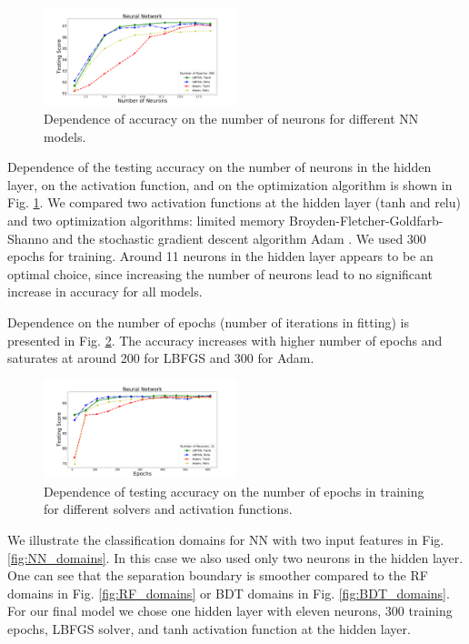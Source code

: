 \documentclass[referee]{aa} %
\begin{document}
\begin{figure}[h]
\centering
\includegraphics[width=0.5\textwidth]{plots/nn_train_neurons_assocnewfeat.pdf}
\caption{Dependence of accuracy on the number of neurons for different NN models.}
\label{fig:NN_neurons}
\end{figure}

Dependence of the testing accuracy on the number of neurons in the hidden layer, on the activation function, 
and on the optimization algorithm is shown in Fig. \ref{fig:NN_neurons}. 
We compared two activation functions at the hidden layer (tanh and relu) and two optimization algorithms: 
limited memory Broyden-Fletcher-Goldfarb-Shanno \citep[LBFGS;][]{lbfgs} 
and the stochastic gradient descent algorithm Adam \citep{2014arXiv1412.6980K}.
We used 300 epochs for training.
Around 11 neurons in the hidden layer appears to be an optimal choice, since increasing the number of neurons lead to no significant increase in accuracy for all models. 

Dependence on the number of epochs (number of iterations in fitting) is presented in Fig. \ref{fig:NN_epochs}. 
The accuracy increases with higher number of epochs and saturates at around 200 for LBFGS and 300 for Adam. 




\begin{figure}[h]
\centering
\includegraphics[width=0.5\textwidth]{plots/nn_train_epochs_assocnewfeat.pdf}
\caption{
Dependence of testing accuracy on the number of epochs in training for different solvers and activation functions.
}
\label{fig:NN_epochs}
\end{figure}
 
We illustrate the classification domains for NN with two input features in Fig. \ref{fig:NN_domains}. 
In this case we also used only two neurons in the hidden layer.
One can see that the separation boundary is smoother compared to the RF domains in Fig. \ref{fig:RF_domains} or BDT domains in Fig. \ref{fig:BDT_domains}.
For our final model we chose one hidden layer with eleven neurons, 300 training epochs, LBFGS solver, and tanh activation function at the hidden layer.
\end{document}
